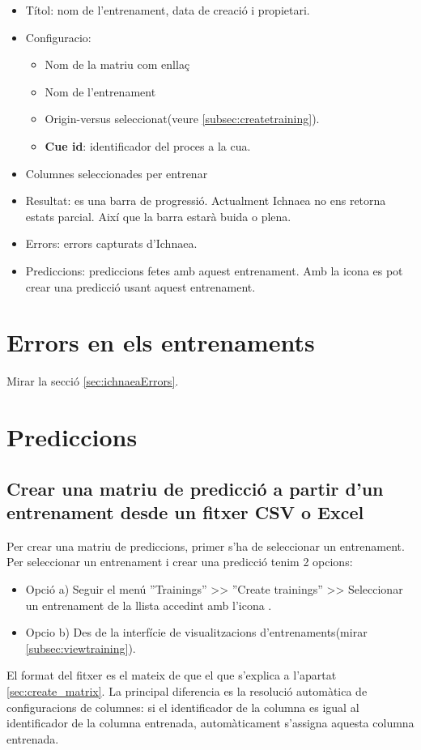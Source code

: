 \begin{itemize}
\item Títol: nom de l'entrenament, data de creació i propietari.
\item Configuracio: 
\begin{itemize}
\item Nom de la matriu com enllaç
\item Nom de l'entrenament
\item Origin-versus seleccionat(veure \ref{subsec:createtraining}).
\item \textbf{Cue id}: identificador del proces a la cua.
\end{itemize}
\item Columnes seleccionades per entrenar
\item Resultat: es una barra de progressió. Actualment Ichnaea no ens retorna estats parcial. Així que la barra estarà buida o plena.
\item Errors: errors capturats d'Ichnaea.
\item Prediccions: prediccions fetes amb aquest entrenament. Amb la icona \iconadd es pot crear una predicció usant aquest entrenament.
\end{itemize}

\section{Errors en els entrenaments}
Mirar la secció \ref{sec:ichnaeaErrors}.

\section{Prediccions}
\subsection{Crear una matriu de predicció a partir d'un entrenament desde un fitxer CSV o Excel}
Per crear una matriu de prediccions, primer s'ha de seleccionar un entrenament. Per seleccionar un entrenament i crear una predicció tenim 2 opcions:
\begin{itemize}
\item Opció a) Seguir el menú ''Trainings'' >> ''Create trainings'' >> Seleccionar un entrenament de la llista accedint amb l'icona \icontableninesquares.
\item Opcio b) Des de la interfície de visualitzacions d'entrenaments(mirar \ref{subsec:viewtraining}).
\end{itemize}
El format del fitxer es el mateix de que el que s'explica a l'apartat \ref{sec:create_matrix}. La principal diferencia es la resolució automàtica de configuracions de columnes: si el identificador de la columna es igual al identificador de la columna entrenada, automàticament s'assigna aquesta columna entrenada.

